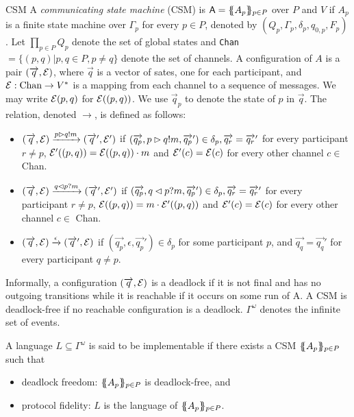 \begin{definition}{CSM}
A \textit{communicating state machine} (CSM) is $\mathsf{A} = \{\!\!\{A_p\}\!\!\}_{p\in P}$
over $P$ and $V$ if $A_p$ is a finite state machine over $\Gamma_p$ for every $p \in P$,
denoted by $(Q_p,\Gamma_p,\delta_p,q_{0,p}, F_p)$. Let $\prod_{p\in P} Q_p$ denote
the set of global states and \verb|Chan| $=\{(p,q)| p,q \in P,p\neq q\}$ denote the set
of channels. A configuration of $A$ is a pair $(\overrightarrow{q}, \mathcal{E})$, where $\overrightarrow{q}$ is a vector
of sates, one for each participant, and $\mathcal{E}:\text{Chan}\to V^*$ is a mapping from 
each channel to a sequence of messages. We may write $\mathcal{E}(p, q)$ for $\mathcal{E}((p, q))$.
We use $\overrightarrow{q}_p$ to denote the state of $p$ in $\overrightarrow{q}$. The
relation, denoted $\to$, is defined as follows:
\begin{itemize}
  \item $(\overrightarrow{q}, \mathcal{E}) \xrightarrow{p\rhd q ! m} (\overrightarrow{q}', \mathcal{E}')$
  if $(\overrightarrow{q_p},p\rhd q ! m,\overrightarrow{q_p}') \in \delta_p, \overrightarrow{q_r} =\overrightarrow{q_r}'$
  for every participant $r\neq p$, $\mathcal{E}'((p,q)) = \mathcal{E}((p,q))\cdot m$ and $\mathcal{E}'(c) = \mathcal{E}(c)$
  for every other channel $c \in $ Chan.
  \item $(\overrightarrow{q}, \mathcal{E}) \xrightarrow{q\lhd p ? m} (\overrightarrow{q}', \mathcal{E}')$
  if $(\overrightarrow{q_p},q\lhd p ? m,\overrightarrow{q_p}') \in \delta_p, \overrightarrow{q_r} =\overrightarrow{q_r}'$
  for every participant $r\neq p$, $\mathcal{E}((p,q)) = m\cdot\mathcal{E}'((p,q))$ and $\mathcal{E}'(c) = \mathcal{E}(c)$
  for every other channel $c \in $ Chan.
  \item $(\overrightarrow{q}, \mathcal{E}) \xrightarrow{\epsilon} (\overrightarrow{q}', \mathcal{E})$ if 
  $(\overrightarrow{q_p},\epsilon,\overrightarrow{q_p}') \in \delta_p$ for some participant $p$, and
  $\overrightarrow{q_q} =\overrightarrow{q_q}'$ for every participant $q\neq p$.
\end{itemize}
\end{definition}

Informally, a configuration $(\overrightarrow{q}, \mathcal{E})$ is a deadlock if it is not final and has no outgoing 
transitions while it is reachable if it occurs on some run of A. A CSM is deadlock-free if no reachable
configuration is a deadlock. $\Gamma^\omega$ denotes the infinite set of events.

\begin{definition}
A language $L \subseteq \Gamma^\omega$ is said to be implementable if there exists a CSM $\{\!\!\{A_p\}\!\!\}_{p\in P}$ such that
\begin{itemize}
  \item deadlock freedom: $\{\!\!\{A_p\}\!\!\}_{p\in P}$ is deadlock-free, and
  \item protocol fidelity: $L$ is the language of $\{\!\!\{A_p\}\!\!\}_{p\in P}$.
\end{itemize}
\end{definition}


